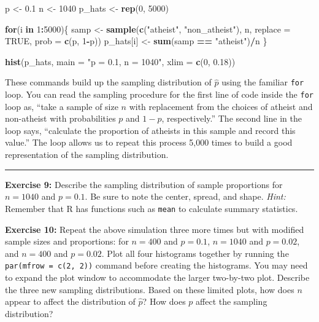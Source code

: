 \documentclass[]{book}
\newenvironment{Shaded}{\begin{snugshade}}{\end{snugshade}}
\newcommand{\ControlFlowTok}[1]{\textcolor[rgb]{0.13,0.29,0.53}{\textbf{#1}}}
\newcommand{\DataTypeTok}[1]{\textcolor[rgb]{0.13,0.29,0.53}{#1}}
\newcommand{\DecValTok}[1]{\textcolor[rgb]{0.00,0.00,0.81}{#1}}
\newcommand{\FloatTok}[1]{\textcolor[rgb]{0.00,0.00,0.81}{#1}}
\newcommand{\KeywordTok}[1]{\textcolor[rgb]{0.13,0.29,0.53}{\textbf{#1}}}
\newcommand{\NormalTok}[1]{#1}
\newcommand{\OperatorTok}[1]{\textcolor[rgb]{0.81,0.36,0.00}{\textbf{#1}}}
\newcommand{\OtherTok}[1]{\textcolor[rgb]{0.56,0.35,0.01}{#1}}
\newcommand{\StringTok}[1]{\textcolor[rgb]{0.31,0.60,0.02}{#1}}
\theoremstyle{definition}
\theoremstyle{definition}
\theoremstyle{definition}
\theoremstyle{remark}
\begin{document}
\begin{Shaded}
\begin{Highlighting}[]
\NormalTok{p <-}\StringTok{ }\FloatTok{0.1}
\NormalTok{n <-}\StringTok{ }\DecValTok{1040}
\NormalTok{p_hats <-}\StringTok{ }\KeywordTok{rep}\NormalTok{(}\DecValTok{0}\NormalTok{, }\DecValTok{5000}\NormalTok{)}

\ControlFlowTok{for}\NormalTok{(i }\ControlFlowTok{in} \DecValTok{1}\OperatorTok{:}\DecValTok{5000}\NormalTok{)\{}
\NormalTok{  samp <-}\StringTok{ }\KeywordTok{sample}\NormalTok{(}\KeywordTok{c}\NormalTok{(}\StringTok{"atheist"}\NormalTok{, }\StringTok{"non_atheist"}\NormalTok{), n, }\DataTypeTok{replace =} \OtherTok{TRUE}\NormalTok{, }\DataTypeTok{prob =} \KeywordTok{c}\NormalTok{(p, }\DecValTok{1}\OperatorTok{-}\NormalTok{p))}
\NormalTok{  p_hats[i] <-}\StringTok{ }\KeywordTok{sum}\NormalTok{(samp }\OperatorTok{==}\StringTok{ "atheist"}\NormalTok{)}\OperatorTok{/}\NormalTok{n}
\NormalTok{\}}

\KeywordTok{hist}\NormalTok{(p_hats, }\DataTypeTok{main =} \StringTok{"p = 0.1, n = 1040"}\NormalTok{, }\DataTypeTok{xlim =} \KeywordTok{c}\NormalTok{(}\DecValTok{0}\NormalTok{, }\FloatTok{0.18}\NormalTok{))}
\end{Highlighting}
\end{Shaded}

These commands build up the sampling distribution of \(\hat{p}\) using
the familiar \texttt{for} loop. You can read the sampling procedure for
the first line of code inside the \texttt{for} loop as, ``take a sample
of size \(n\) with replacement from the choices of atheist and
non-atheist with probabilities \(p\) and \(1 - p\), respectively.'' The
second line in the loop says, ``calculate the proportion of atheists in
this sample and record this value.'' The loop allows us to repeat this
process 5,000 times to build a good representation of the sampling
distribution.

\begin{center}\rule{0.5\linewidth}{\linethickness}\end{center}

\textbf{Exercise 9:} Describe the sampling distribution of sample
proportions for \(n = 1040\) and \(p = 0.1\). Be sure to note the
center, spread, and shape. \emph{Hint:} Remember that R has functions
such as \texttt{mean} to calculate summary statistics.

\textbf{Exercise 10:} Repeat the above simulation three more times but
with modified sample sizes and proportions: for \(n = 400\) and
\(p = 0.1\), \(n = 1040\) and \(p = 0.02\), and \(n = 400\) and
\(p = 0.02\). Plot all four histograms together by running the
\texttt{par(mfrow\ =\ c(2,\ 2))} command before creating the histograms.
You may need to expand the plot window to accommodate the larger
two-by-two plot. Describe the three new sampling distributions. Based on
these limited plots, how does \(n\) appear to affect the distribution of
\(\hat{p}\)? How does \(p\) affect the sampling distribution?
\end{document}

